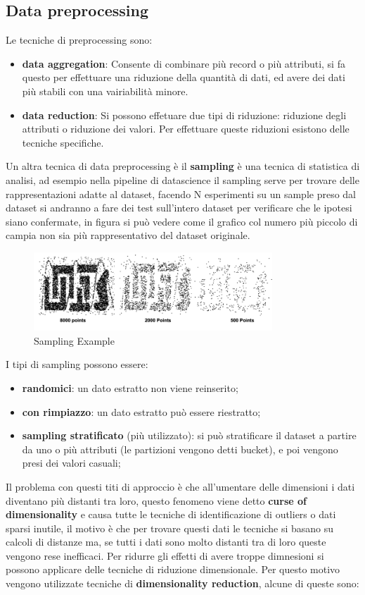 \documentclass[12pt]{article}
\begin{document}
\subsection{Data preprocessing}
Le tecniche di preprocessing sono:
\begin{itemize}
    \item \textbf{data aggregation}: Consente di combinare pi\`u record o pi\`u attributi, si fa questo per effettuare una riduzione della quantit\`a di dati, ed avere dei dati pi\`u stabili con una vairiabilit\`a minore.
    \item \textbf{data reduction}: Si possono effetuare due tipi di riduzione: riduzione degli attributi o riduzione dei valori. Per effettuare queste riduzioni esistono delle tecniche specifiche.
\end{itemize}
Un altra tecnica di data preprocessing \`e il \textbf{sampling} \`e una tecnica di statistica di analisi, ad esempio nella pipeline di datascience il sampling serve per trovare delle rappresentazioni adatte al dataset, facendo N esperimenti su un sample preso dal dataset si andranno a fare dei test sull'intero dataset per verificare che le ipotesi siano confermate, in figura si pu\`o vedere come il grafico col numero pi\`u piccolo di campia non sia pi\`u rappresentativo del dataset originale.
\begin{figure}[H]
    \centering
    \includegraphics[width=0.8\textwidth]{sampling-example.png}
    \caption{Sampling Example}
    \label{fig:sampling-example}
\end{figure}
I tipi di sampling possono essere:
\begin{itemize}
    \item \textbf{randomici}: un dato estratto non viene reinserito;
    \item \textbf{con rimpiazzo}: un dato estratto pu\`o essere riestratto;
    \item \textbf{sampling stratificato} (pi\`u utilizzato): si pu\`o stratificare il dataset a partire da uno o pi\`u attributi (le partizioni vengono detti bucket), e poi vengono presi dei valori casuali;
\end{itemize} 
Il problema con questi titi di approccio \`e che all'umentare delle dimensioni i dati diventano pi\`u distanti tra loro, questo fenomeno viene detto \textbf{curse of dimensionality} e causa tutte le tecniche di identificazione di outliers o dati sparsi inutile, il motivo \`e che per trovare questi dati le tecniche si basano su calcoli di distanze ma, se tutti i dati sono molto distanti tra di loro queste vengono rese inefficaci. Per ridurre gli effetti di avere troppe dimnesioni si possono applicare delle tecniche di riduzione dimensionale. Per questo motivo vengono utilizzate tecniche di \textbf{dimensionality reduction}, alcune di queste sono:
\end{document}
